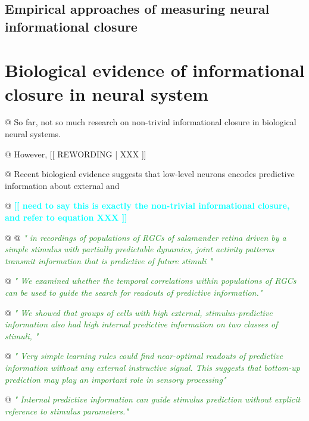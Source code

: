 \documentclass[utf8]{article}
\newenvironment{ants}
			{
			 \begin{easylist}[itemize]		
		 	}
			{
			\end{easylist}
			}
\newcommand{\rewrite}[1]{\textcolor{ForestGreen}{\textit{"#1"}}\newline}
\newcommand{\rewording}[1]{\textcolor{RawSienna}{[[ REWORDING | #1 ]]}}
\newcommand{\toWrite}[1]{\noindent
			\textcolor{Cyan}{\textbf{[[ #1 ]]}}}
\begin{document}
			
			
		\subsection{Empirical approaches of measuring neural informational closure}
		
		
	\section{Biological evidence of informational closure in neural system}
		
		\begin{ants}		
			
			
			@ So far, not so much research on non-trivial informational closure in biological neural systems. 
			
			@ However, \rewording{XXX}
			
			@ Recent biological evidence suggests that low-level neurons encodes predictive information about external  and 
			
			@ \toWrite{
				need to say this is exactly the non-trivial informational closure, and refer to equation XXX}
			
			@ \cite{sederberg2018learning}
			@ \rewrite{
				in recordings of populations of RGCs of salamander retina driven by a simple stimulus with partially predictable dynamics, joint activity patterns transmit information that is predictive of future stimuli }
			
			@ \rewrite{
				We examined whether the temporal correlations within populations of RGCs can be used to guide the search for readouts of predictive information.}
			
			@ \rewrite{
				We showed that groups of cells with high external, stimulus-predictive information also had high internal predictive information on two classes of stimuli, }
			
			@ \rewrite{
				Very simple learning rules could find near-optimal readouts of predictive information without any external instructive signal. This suggests that bottom-up prediction may play an important role in sensory processing}
			
			@ \rewrite{
				Internal predictive information can guide stimulus prediction without explicit reference to stimulus parameters.}
			

\end{ants}
\end{document}
